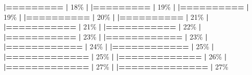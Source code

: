 \documentclass[
]{book}
\newenvironment{Shaded}{\begin{snugshade}}{\end{snugshade}}
\newcommand{\DecValTok}[1]{\textcolor[rgb]{0.00,0.00,0.81}{#1}}
\newcommand{\ErrorTok}[1]{\textcolor[rgb]{0.64,0.00,0.00}{\textbf{#1}}}
\newcommand{\NormalTok}[1]{#1}
\newcommand{\SpecialCharTok}[1]{\textcolor[rgb]{0.81,0.36,0.00}{\textbf{#1}}}
\begin{document}
\begin{Shaded}
\begin{Highlighting}[]
  \ErrorTok{|=========}                                         \ErrorTok{|}  \DecValTok{18}\NormalTok{\%}
  \SpecialCharTok{|}                                                        
  \ErrorTok{|=========}                                         \ErrorTok{|}  \DecValTok{19}\NormalTok{\%}
  \SpecialCharTok{|}                                                        
  \ErrorTok{|==========}                                        \ErrorTok{|}  \DecValTok{19}\NormalTok{\%}
  \SpecialCharTok{|}                                                        
  \ErrorTok{|==========}                                        \ErrorTok{|}  \DecValTok{20}\NormalTok{\%}
  \SpecialCharTok{|}                                                        
  \ErrorTok{|==========}                                        \ErrorTok{|}  \DecValTok{21}\NormalTok{\%}
  \SpecialCharTok{|}                                                        
  \ErrorTok{|===========}                                       \ErrorTok{|}  \DecValTok{21}\NormalTok{\%}
  \SpecialCharTok{|}                                                        
  \ErrorTok{|===========}                                       \ErrorTok{|}  \DecValTok{22}\NormalTok{\%}
  \SpecialCharTok{|}                                                        
  \ErrorTok{|===========}                                       \ErrorTok{|}  \DecValTok{23}\NormalTok{\%}
  \SpecialCharTok{|}                                                        
  \ErrorTok{|============}                                      \ErrorTok{|}  \DecValTok{23}\NormalTok{\%}
  \SpecialCharTok{|}                                                        
  \ErrorTok{|============}                                      \ErrorTok{|}  \DecValTok{24}\NormalTok{\%}
  \SpecialCharTok{|}                                                        
  \ErrorTok{|============}                                      \ErrorTok{|}  \DecValTok{25}\NormalTok{\%}
  \SpecialCharTok{|}                                                        
  \ErrorTok{|=============}                                     \ErrorTok{|}  \DecValTok{25}\NormalTok{\%}
  \SpecialCharTok{|}                                                        
  \ErrorTok{|=============}                                     \ErrorTok{|}  \DecValTok{26}\NormalTok{\%}
  \SpecialCharTok{|}                                                        
  \ErrorTok{|=============}                                     \ErrorTok{|}  \DecValTok{27}\NormalTok{\%}
  \SpecialCharTok{|}                                                        
  \ErrorTok{|==============}                                    \ErrorTok{|}  \DecValTok{27}\NormalTok{\%}

\end{Highlighting}
\end{Shaded}
\end{document}
